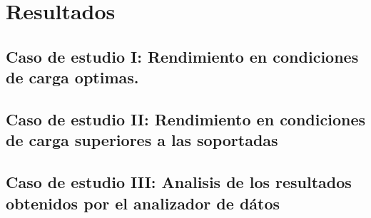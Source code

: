 \chapter{Resultados}
\section{Caso de estudio I: Rendimiento en condiciones de carga optimas.}
\section{Caso de estudio II: Rendimiento en condiciones de carga superiores a
  las soportadas}
\section{Caso de estudio III: Analisis de los resultados obtenidos por el
  analizador de dátos}